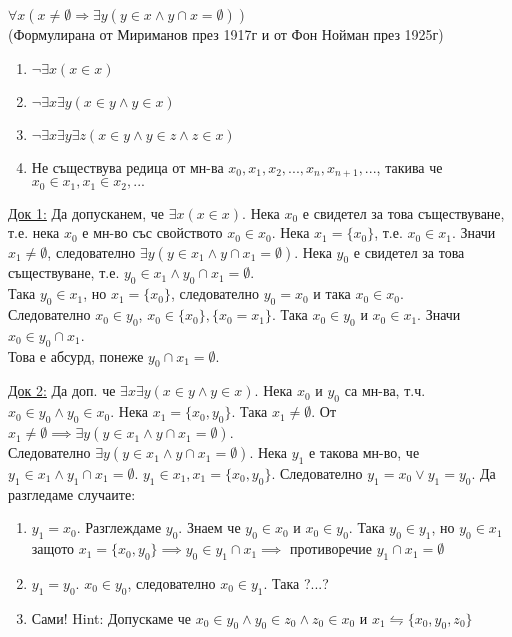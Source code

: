 \documentclass[fleqn, titlepage, 12pt]{report}
\begin{document}
$ \forall{x} (x \neq \emptyset \Rightarrow \exists{y} (y \in x \land y \cap x = \emptyset ))$\\
(Формулирана от Мириманов през 1917г и от Фон Нойман през 1925г)
\bigbreak

\begin{enumerate}
  \item $ \lnot \exists{x} (x \in x)$
  \item $ \lnot \exists{x} \exists{y} (x \in y \land y \in x)$
  \item $ \lnot \exists{x} \exists{y} \exists{z} (x \in y \land y \in z \land z \in x)$
  \item Не съществува редица от мн-ва $x_0, x_1, x_2, ..., x_n, x_{n+1}, ...$, такива че$x_0 \in x_1, x_1 \in x_2, ...$
\end{enumerate}
\bigbreak

\underline{Док 1:} Да допусканем, че $ \exists{x} (x \in x)$. Нека $x_0$ е свидетел за това съществуване, т.е. нека $x_0$ е
мн-во със свойството $x_0 \in x_0$. Нека $x_1 = \{ x_0\}$, т.е. $x_0 \in x_1$. Значи $x_1 \neq \emptyset$, следователно
$ \exists{y} (y \in x_1 \land y \cap x_1 = \emptyset)$. Нека $y_0$ е свидетел за това съществуване,
т.е. $y_0 \in x_1 \land y_0 \cap x_1 = \emptyset$.\\
Така $y_0 \in x_1$, но $x_1 = \{ x_0\}$, следователно $y_0 = x_0$ и така $x_0 \in x_0$.\\
Следователно $x_0 \in y_0$, $x_0 \in \{ x_0\}, \{ x_0 = x_1\}$. Така $x_0 \in y_0$ и $x_0 \in x_1$.
Значи $x_0 \in y_0 \cap x_1$.\\
Това е абсурд, понеже $y_0 \cap x_1 = \emptyset$.
\bigbreak

\underline{Док 2:} Да доп. че $ \exists{x} \exists{y} (x \in y \land y \in x)$. Нека $x_0$ и $y_0$ са мн-ва, т.ч.
$x_0 \in y_0 \land  y_0 \in x_0$. Нека $x_1 = \{ x_0, y_0\}$. Така $x_1 \neq \emptyset$.
От $x_1 \neq \emptyset \implies \exists{y} (y \in x_1 \land  y \cap x_1 = \emptyset)$.\\
Следователно $ \exists{y} (y \in x_1 \land  y \cap x_1 = \emptyset)$. Нека $y_1$ е такова мн-во,
че $y_1 \in x_1 \land  y_1 \cap x_1 = \emptyset$. $y_1 \in x_1, x_1 = \{ x_0, y_0\}$.
Следователно $y_1 = x_0 \lor y_1 = y_0$. Да разгледаме случаите:
\begin{enumerate}
  \item $y_1 = x_0$. Разглеждаме $y_0$. Знаем че $y_0 \in x_0$ и $x_0 \in y_0$. Така $y_0 \in y_1$,
    но $y_0 \in x_1$ защото $x_1 = \{ x_0, y_0 \} \implies y_0 \in y_1 \cap x_1 \implies$
    противоречие $y_1 \cap x_1 = \emptyset$
  \item $y_1 = y_0$. $x_0 \in y_0$, следователно $x_0 \in y_1$. Така ?...?
  \item Сами! Hint: Допускаме че $x_0 \in y_0 \land  y_0 \in z_0 \land  z_0 \in x_0$
    и $x_1 \leftrightharpoons \{ x_0, y_0, z_0\}$
\end{enumerate}
\end{document}
